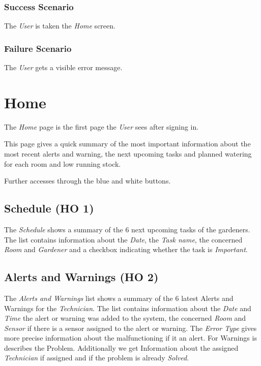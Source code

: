 \subsubsection{Success Scenario}
The \emph{User} is taken the \emph{Home} screen.

\subsubsection{Failure Scenario}
The \emph{User} gets a visible error message.





\newpage
\section{Home}
\label{sec:appendix_Home}
\mbox{} \par
\noindent{}

The \emph{Home} page is the first page the \emph{User} sees after signing in.

This page gives a quick summary of the most important information about the most
recent alerts and warning, the next upcoming tasks and planned watering for each
room and low running stock. 

Further accesses through the blue and white buttons.

\subsection{Schedule (HO 1)}
The \emph{Schedule} shows a summary of the 6 next upcoming tasks of the
gardeners. The list contains information about the \emph{Date}, the \emph{Task
name}, the concerned \emph{Room} and \emph{Gardener} and a checkbox indicating
whether the task is \emph{Important}.

\subsection{Alerts and Warnings (HO 2)}
The \emph{Alerts and Warnings} list shows a summary of the 6 latest Alerts and
Warnings for the \emph{Technician}. The list contains information about the
\emph{Date} and \emph{Time} the alert or warning was added to the system, the
concerned \emph{Room} and \emph{Sensor} if there is a sensor assigned to the
alert or warning. The \emph{Error Type} gives more precise information about the
malfunctioning if it an alert. For Warnings is describes the Problem.
Additionally we get Information about the assigned \emph{Technician} if assigned
and if the problem is already \emph{Solved}.

